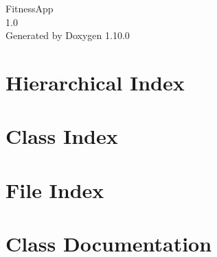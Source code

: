 \documentclass[twoside]{book}
\newcommand{\+}{\discretionary{\mbox{\scriptsize$\hookleftarrow$}}{}{}}
\newcommand{\clearemptydoublepage}{%
    \newpage{\pagestyle{empty}\cleardoublepage}%
  }
\begin{document}
  \raggedbottom
    \hypersetup{pageanchor=false,
                bookmarksnumbered=true,
                pdfencoding=unicode
               }
  \begin{titlepage}
  \vspace*{7cm}
  \begin{center}%
  {\Large Fitness\+App}\\
  [1ex]\large 1.\+0 \\
  \vspace*{1cm}
  {\large Generated by Doxygen 1.10.0}\\
  \end{center}
  \end{titlepage}
  \clearemptydoublepage
  \tableofcontents
  \clearemptydoublepage
  \hypersetup{pageanchor=true}
\chapter{Hierarchical Index}

\chapter{Class Index}

\chapter{File Index}

\chapter{Class Documentation}






















\end{document}
